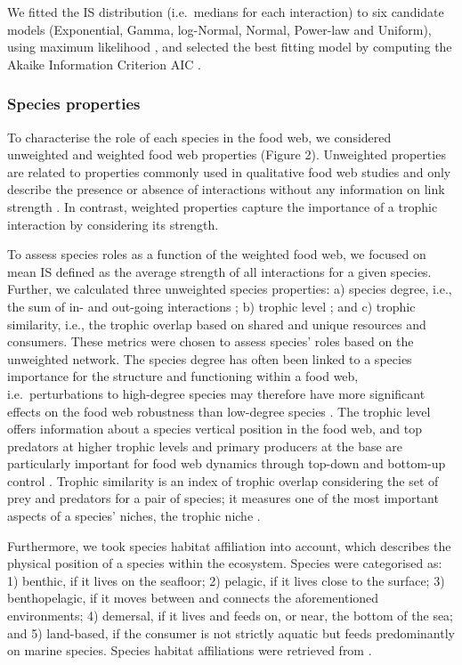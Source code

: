 \documentclass[gc, manuscript]{copernicus}
\begin{document}
We fitted the IS distribution (i.e.~medians for each interaction) to six
candidate models (Exponential, Gamma, log-Normal, Normal, Power-law and
Uniform), using maximum likelihood \citep{McCallum2008}, and selected
the best fitting model by computing the Akaike Information Criterion AIC
\citep{Burnham2002}.

\subsubsection{Species properties}

To characterise the role of each species in the food web, we considered
unweighted and weighted food web properties (Figure 2). Unweighted
properties are related to properties commonly used in qualitative food
web studies and only describe the presence or absence of interactions
without any information on link strength
\citep{Martinez1991, Dunne2002, Borrelli2014}. In contrast, weighted
properties capture the importance of a trophic interaction by
considering its strength.

To assess species roles as a function of the weighted food web, we
focused on mean IS defined as the average strength of all interactions
for a given species. Further, we calculated three unweighted species
properties: a) species degree, i.e., the sum of in- and out-going
interactions ; b) trophic level ; and c) trophic similarity, i.e., the
trophic overlap based on shared and unique resources and consumers.
These metrics were chosen to assess species' roles based on the
unweighted network. The species degree has often been linked to a
species importance for the structure and functioning within a food web,
i.e.~perturbations to high-degree species may therefore have more
significant effects on the food web robustness than low-degree species
\citetext{\citealp{Dunne2002a}; \citealp[references
in][]{Cirtwill2018a}}. The trophic level offers information about a
species vertical position in the food web, and top predators at higher
trophic levels and primary producers at the base are particularly
important for food web dynamics through top-down and bottom-up control
\citep[references in][]{Cirtwill2018a}. Trophic similarity is an index
of trophic overlap considering the set of prey and predators for a pair
of species; it measures one of the most important aspects of a species'
niches, the trophic niche \citep{Martinez1991, Williams2000}.

Furthermore, we took species habitat affiliation into account, which
describes the physical position of a species within the ecosystem.
Species were categorised as: 1) benthic, if it lives on the seafloor; 2)
pelagic, if it lives close to the surface; 3) benthopelagic, if it moves
between and connects the aforementioned environments; 4) demersal, if it
lives and feeds on, or near, the bottom of the sea; and 5) land-based,
if the consumer is not strictly aquatic but feeds predominantly on
marine species. Species habitat affiliations were retrieved from
\citet{Jacob2011}.
\end{document}
